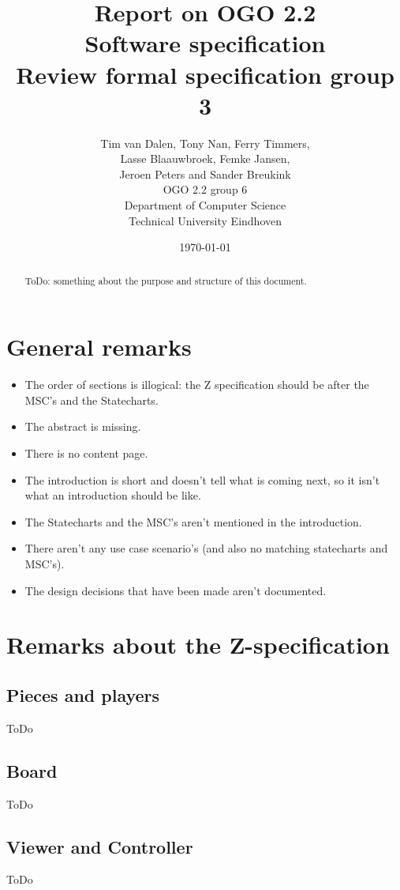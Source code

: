 \documentclass[a4paper,11pt]{article}
\title{Report on OGO 2.2 \\ Software specification\\ Review formal specification group 3}
\author{
        Tim van Dalen, Tony Nan, Ferry Timmers, \\ Lasse Blaauwbroek, Femke Jansen, \\Jeroen Peters and Sander Breukink\\ OGO 2.2 group 6 \\
                Department of Computer Science\\
        Technical University Eindhoven\\
}
\date{\today}
\begin{document}
\maketitle

\begin{abstract}
ToDo: something about the purpose and structure of this document.
\end{abstract}

\newpage
	
	\tableofcontents
	\newpage
	
	\section{General remarks}
    \begin{itemize}
        \item The order of sections is illogical: the Z specification should be after the MSC's and the Statecharts.
        \item The abstract is missing.
        \item There is no content page.
        \item The introduction is short and doesn't tell what is coming next, so it isn't what an introduction should be like.
        \item The Statecharts and the MSC's aren't mentioned in the introduction.
        \item There aren't any use case scenario's (and also no matching statecharts and MSC's).
        \item The design decisions that have been made aren't documented.
    \end{itemize}
	
	\section{Remarks about the Z-specification}

    \subsection{Pieces and players}
    ToDo

    \subsection{Board}
    ToDo

    \subsection{Viewer and Controller}
    ToDo
\end{document}
